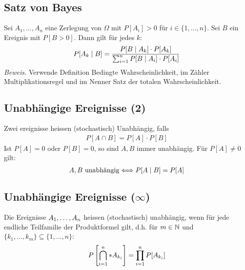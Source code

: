 \subsection*{Satz von Bayes}
Sei $A_1, \dots, A_n$ eine Zerlegung von $\Omega$ mit $P[A_i] > 0$ für $i \in
  \{1, \dots, n\}$. Sei $B$ ein Ereignis mit $P[B > 0]$. Dann gilt für jedes $k$:
\begin{align*}
  P[A_k \; | \; B] = \frac{P[B \; | \; A_k] \cdot P[A_k] }{\sum_{i = 1}^n P[B \; | \; A_i] \cdot P[A_i]}
\end{align*}
\emph{Beweis.} Verwende Definition Bedingte Wahrscheinlichkeit,
im Zähler Multiplikationsregel und im Nenner Satz der totalen Wahrscheinlichkeit.
\subsection*{Unabhängige Ereignisse  (2)}
Zwei ereignisse heissen (stochastisch) Unabhängig, falls
\begin{align*}
  P[A \cap B] = P[A] \cdot P[B]
\end{align*}
Ist $P[A] = 0$ oder $P[B] = 0$, so sind $A, B$ immer unabhängig.
Für $P[A] \neq 0$ gilt:
\begin{align*}
  A, B \text{ unabhängig} \Longleftrightarrow P[A \; | \; B] = P[A]
\end{align*}
\subsection*{Unabhängige Ereignisse  ($\infty$)}
Die Ereignisse $A_1, \dots, A_n$ heissen (stochastisch) unabhängig, wenn für jede
endliche Teilfamilie der Produktformel gilt, d.h. für $m \in \mathbb{N}$ und $\{k_1,
  \dots, k_m\} \subseteq \{1, \dots, n\}$:
\begin{align*}
  P \left[\bigcap_{i = 1}^n* A_{k_i} \right] = \prod_{i = 1}^n P[A_{k_i}]
\end{align*}
